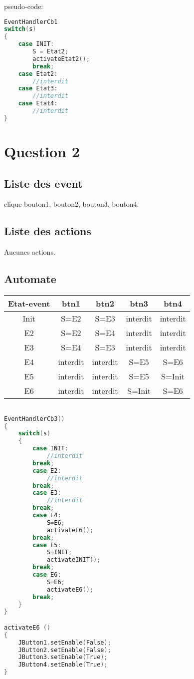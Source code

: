 \documentclass[10pt,a4paper]{article}
\begin{document}
pseudo-code:
\begin{lstlisting}[language=C]
EventHandlerCb1
switch(s)
{
    case INIT:
        S = Etat2;
        activateEtat2();
        break;
    case Etat2:
        //interdit
    case Etat3:
        //interdit
    case Etat4:
        //interdit
}
\end{lstlisting}

\section*{Question 2}

\subsection*{Liste des event}
clique bouton1, bouton2, bouton3, bouton4.

\subsection*{Liste des actions}
Aucunes actions.

\subsection*{Automate}

\begin{tabular}{c|c|c|c|c}
\hline
Etat-event & btn1 & btn2 & btn3 & btn4\\
\hline
Init & S=E2 & S=E3 & interdit & interdit\\
\hline
E2 & S=E2 & S=E4 & interdit & interdit \\
\hline
E3 & S=E4 & S=E3 & interdit & interdit \\
\hline
E4 & interdit & interdit & S=E5 & S=E6\\
\hline
E5 & interdit & interdit & S=E5 & S=Init\\
\hline
E6 & interdit & interdit & S=Init & S=E6 \\
\end{tabular}

\begin{lstlisting}[language=C]

EventHandlerCb3()
{
    switch(s)
    {
        case INIT:
            //interdit
        break;
        case E2:
            //interdit
        break;
        case E3:
            //interdit
        break;
        case E4:
            S=E6;
            activateE6();
        break;
        case E5:
            S=INIT;
            activateINIT();
        break;
        case E6:
            S=E6;
            activateE6();
        break;
    }
}

activateE6 ()
{
    JButton1.setEnable(False);
    JButton2.setEnable(False);
    JButton3.setEnable(True);
    JButton4.setEnable(True);
}
\end{lstlisting}
\end{document}
